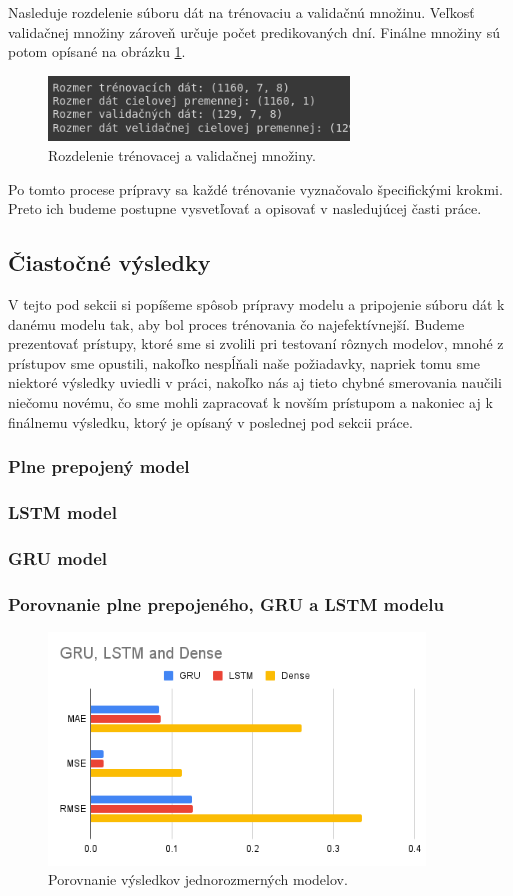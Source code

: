 Nasleduje rozdelenie súboru dát na trénovaciu a validačnú množinu. Veľkosť validačnej množiny zároveň určuje počet predikovaných dní. Finálne množiny sú potom opísané na obrázku \ref{mnoziny}.
\begin{figure}[!htbp]
  \centering
  \includegraphics[width=8cm]{img/mnoziny.png}
  \caption{Rozdelenie trénovacej a validačnej množiny.}
  \label{mnoziny}
\end{figure}

Po tomto procese prípravy sa každé trénovanie vyznačovalo špecifickými krokmi. Preto ich budeme postupne vysvetľovať a opisovať v nasledujúcej časti práce.

\subsection{Čiastočné výsledky}
V tejto pod sekcii si popíšeme spôsob prípravy modelu a pripojenie súboru dát k danému modelu tak, aby bol proces trénovania čo najefektívnejší. Budeme prezentovať prístupy, ktoré sme si zvolili pri testovaní rôznych modelov, mnohé z prístupov sme opustili, nakoľko nespĺňali naše požiadavky, napriek tomu sme niektoré výsledky uviedli v práci, nakoľko nás aj tieto chybné smerovania naučili niečomu novému, čo sme mohli zapracovať k novším prístupom a nakoniec aj k finálnemu výsledku, ktorý je opísaný v poslednej pod sekcii práce.

\subsubsection{Plne prepojený model} 
\subsubsection{LSTM model} 
\subsubsection{GRU model} 
\subsubsection{Porovnanie plne prepojeného, GRU a LSTM modelu}
\begin{figure}[!htbp]
  \centering
  \includegraphics[width=10cm]{img/GRU, LSTM and Dense.png}
  \caption{Porovnanie výsledkov jednorozmerných modelov.}
  \label{univariate}
\end{figure}

